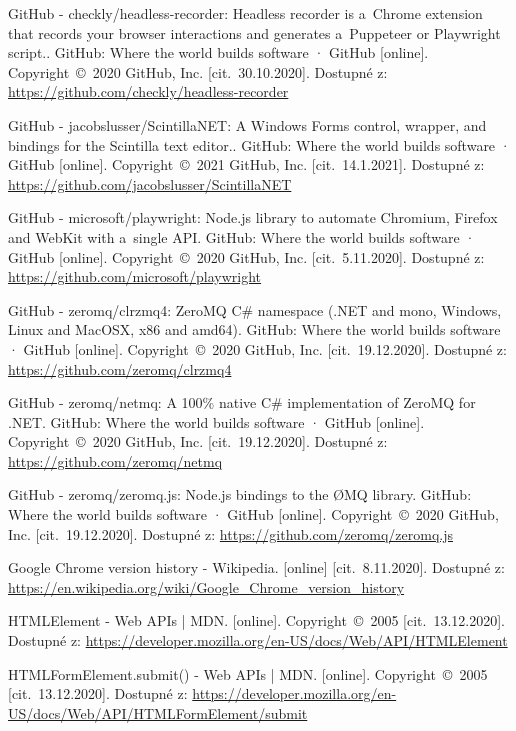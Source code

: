 \begin{thebibliography}{99}
 GitHub - checkly/headless-recorder: Headless recorder is a~Chrome extension that records your browser interactions and generates a~Puppeteer or Playwright script.. GitHub: Where the world builds software · GitHub [online]. Copyright~©~2020 GitHub, Inc. [cit.~30.10.2020]. Dostupné z: \url{https://github.com/checkly/headless-recorder}

 GitHub - jacobslusser/ScintillaNET: A Windows Forms control, wrapper, and bindings for the Scintilla text editor.. GitHub: Where the world builds software · GitHub [online]. Copyright~©~2021 GitHub, Inc. [cit.~14.1.2021]. Dostupné z: \url{https://github.com/jacobslusser/ScintillaNET}

 GitHub - microsoft/playwright: Node.js library to automate Chromium, Firefox and WebKit with a~single API. GitHub: Where the world builds software · GitHub [online]. Copyright~©~2020 GitHub, Inc. [cit.~5.11.2020]. Dostupné z: \url{https://github.com/microsoft/playwright}

 GitHub - zeromq/clrzmq4: ZeroMQ C\# namespace (.NET and mono, Windows, Linux and MacOSX, x86 and amd64). GitHub: Where the world builds software · GitHub [online]. Copyright~©~2020 GitHub, Inc. [cit.~19.12.2020]. Dostupné z: \url{https://github.com/zeromq/clrzmq4}

 GitHub - zeromq/netmq: A 100\% native C\# implementation of ZeroMQ for .NET. GitHub: Where the world builds software · GitHub [online]. Copyright~©~2020 GitHub, Inc. [cit.~19.12.2020]. Dostupné z: \url{https://github.com/zeromq/netmq}

 GitHub - zeromq/zeromq.js: Node.js bindings to the ØMQ library. GitHub: Where the world builds software · GitHub [online]. Copyright~©~2020 GitHub, Inc. [cit.~19.12.2020]. Dostupné z: \url{https://github.com/zeromq/zeromq.js}

 Google Chrome version history - Wikipedia. [online] [cit.~8.11.2020]. Dostupné z: \url{https://en.wikipedia.org/wiki/Google_Chrome_version_history}

 HTMLElement - Web APIs | MDN. [online]. Copyright~©~2005 [cit.~13.12.2020]. Dostupné z: \url{https://developer.mozilla.org/en-US/docs/Web/API/HTMLElement}

 HTMLFormElement.submit() - Web APIs | MDN. [online]. Copyright~©~2005 [cit.~13.12.2020]. Dostupné z: \url{https://developer.mozilla.org/en-US/docs/Web/API/HTMLFormElement/submit}


\end{thebibliography}
